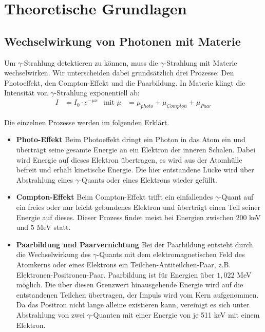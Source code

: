 \section{Theoretische Grundlagen}
\cite{anleitung}
\subsection{Wechselwirkung von Photonen mit Materie}

Um $\gamma$-Strahlung detektieren zu können, muss die $\gamma$-Strahlung mit Materie wechselwirken. Wir unterscheiden dabei grundsätzlich drei Prozesse: Den Photoeffekt, den Compton-Effekt und die Paarbildung. In Materie klingt die Intensität von $\gamma$-Strahlung exponentiell ab:
\begin{align}
I&= I_0\cdot e^{-\mu x}
&\text{mit } 
\mu &= \mu_{photo} + \mu_{Compton} + \mu_{Paar}
\end{align}

Die einzelnen Prozesse werden im folgenden Erklärt.\cite{demtröder}

\begin{itemize}
\item \textbf{Photo-Effekt}
Beim Photoeffekt dringt ein Photon in das Atom ein und überträgt seine gesamte Energie an ein Elektron der inneren Schalen. Dabei wird Energie auf dieses Elektron übertragen, es wird aus der Atomhülle befreit und erhält kinetische Energie. Die hier entstandene Lücke wird über Abstrahlung eines $\gamma$-Quants oder eines Elektrons wieder gefüllt.

\item\textbf{Compton-Effekt}
Beim Compton-Effekt trifft ein einfallendes $\gamma$-Quant auf ein freies oder nur leicht gebundenes Elektron und überträgt einen Teil seiner Energie auf dieses. Dieser Prozess findet meist bei Energien zwischen $200$ keV und $5$ MeV statt.

\item\textbf{Paarbildung und Paarvernichtung \label{PVN1}}
Bei der Paarbildung entsteht durch die Wechselwirkung des $\gamma$-Quants mit dem elektromagnetischen Feld des Atomkerns oder eines Elektrons ein Teilchen-Antiteilchen-Paar, z.B. Elektronen-Positronen-Paar. Paarbildung ist für Energien über $1,022$ MeV möglich. Die über diesen Grenzwert hinausgehende Energie wird auf die entstandenen Teilchen übertragen, der Impuls wird vom Kern aufgenommen. Da das Positron nicht lange alleine existieren kann, vereinigt es sich unter Abstrahlung von zwei $\gamma$-Quanten mit einer Energie von je 511 keV mit einem Elektron.
\end{itemize}

